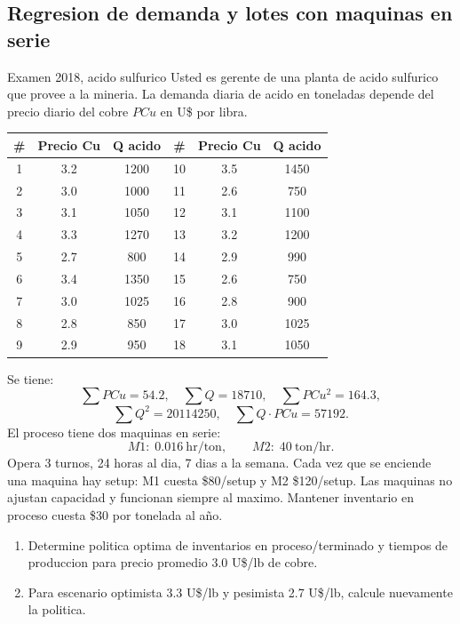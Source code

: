 \subsection{Regresion de demanda y lotes con maquinas en serie}

\begin{enunciado}{Examen 2018, acido sulfurico}
Usted es gerente de una planta de acido sulfurico que provee a la mineria. La demanda diaria de acido en toneladas depende del precio diario del cobre $PCu$ en U\$ por libra.

\begin{center}
\begin{tabular}{c|cc|c|cc}
\toprule
\# & Precio Cu & Q acido & \# & Precio Cu & Q acido\\
\midrule
1&3.2&1200&10&3.5&1450\\
2&3.0&1000&11&2.6&750\\
3&3.1&1050&12&3.1&1100\\
4&3.3&1270&13&3.2&1200\\
5&2.7&800&14&2.9&990\\
6&3.4&1350&15&2.6&750\\
7&3.0&1025&16&2.8&900\\
8&2.8&850&17&3.0&1025\\
9&2.9&950&18&3.1&1050\\
\bottomrule
\end{tabular}
\end{center}

Se tiene:
\[
  \sum PCu=54.2,\quad \sum Q=18710,\quad \sum PCu^2=164.3,
\]
\[
  \sum Q^2=20114250,\quad \sum Q\cdot PCu=57192.
\]
El proceso tiene dos maquinas en serie:
\[
  M1:\;0.016\ \text{hr/ton},\qquad M2:\;40\ \text{ton/hr}.
\]
Opera 3 turnos, 24 horas al dia, 7 dias a la semana. Cada vez que se enciende una maquina hay setup: M1 cuesta \$80/setup y M2 \$120/setup. Las maquinas no ajustan capacidad y funcionan siempre al maximo. Mantener inventario en proceso cuesta \$30 por tonelada al año.

\begin{enumerate}[label=\alph*)]
  \item Determine politica optima de inventarios en proceso/terminado y tiempos de produccion para precio promedio 3.0 U\$/lb de cobre.
  \item Para escenario optimista 3.3 U\$/lb y pesimista 2.7 U\$/lb, calcule nuevamente la politica.
\end{enumerate}
\end{enunciado}

